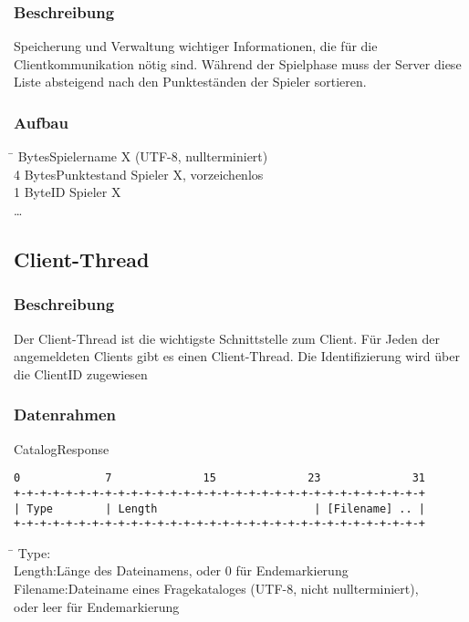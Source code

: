 \documentclass[a4paper,10pt]{article}
\begin{document}
\subsubsection{Beschreibung}

Speicherung und Verwaltung wichtiger Informationen, die für die Clientkommunikation nötig sind. Während der Spielphase muss der Server diese Liste absteigend nach
den Punkteständen der Spieler sortieren.

\subsubsection{Aufbau}

\begin{tabbing}
\hspace{2 cm}\= Bytes\>Spielername X (UTF-8, nullterminiert)\\
4 Bytes\>Punktestand Spieler X, vorzeichenlos\\
1 Byte\>ID Spieler X\\
\>…
\end{tabbing}


\subsection{Client-Thread}

\subsubsection{Beschreibung}

Der Client-Thread ist die wichtigste Schnittstelle zum Client. Für Jeden der angemeldeten Clients gibt es einen Client-Thread. 
Die Identifizierung wird über die ClientID zugewiesen


\subsubsection{Datenrahmen}

CatalogResponse

\begin{Verbatim}[fontfamily=courier]
 0             7              15              23              31
+-+-+-+-+-+-+-+-+-+-+-+-+-+-+-+-+-+-+-+-+-+-+-+-+-+-+-+-+-+-+-+
| Type        | Length                        | [Filename] .. |
+-+-+-+-+-+-+-+-+-+-+-+-+-+-+-+-+-+-+-+-+-+-+-+-+-+-+-+-+-+-+-+
\end{Verbatim}

\begin{tabbing}
\hspace{2 cm}\=\kill
Type:\\
Length:\>Länge des Dateinamens, oder 0 für Endemarkierung\\
Filename:\>Dateiname eines Fragekataloges (UTF-8, nicht nullterminiert), \\
\>oder leer für Endemarkierung
\end{tabbing}
\end{document}
